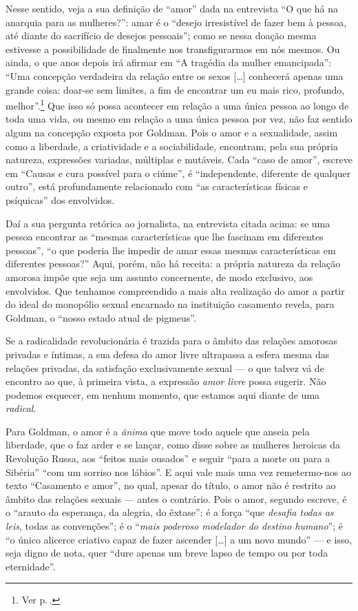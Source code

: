 Nesse sentido, veja a sua definição de ``amor''
dada na entrevista ``O que há na anarquia
para as mulheres?'': amar é o ``desejo irresistível de fazer bem à
pessoa, até diante do sacrifício de desejos pessoais''; como se nessa
doação mesma estivesse a possibilidade de finalmente nos transfigurarmos
em nós mesmos. Ou ainda, o que anos depois irá afirmar em ``A tragédia
da mulher emancipada'': ``Uma concepção verdadeira da relação entre os
sexos {[}\ldots{]} conhecerá apenas uma grande coisa: doar-se sem limites,
a fim de encontrar um eu mais rico, profundo, melhor''.\footnote{Ver p.\,\pageref{concepcao}.} Que isso só
possa acontecer em relação a uma única pessoa ao longo de toda uma
vida, ou mesmo em relação a uma única pessoa por vez, não faz sentido algum na
concepção exposta por Goldman. Pois o amor e a
sexualidade, assim como a liberdade, a criatividade e a sociabilidade,
encontram, pela sua própria natureza, expressões variadas, múltiplas e
mutáveis. Cada ``caso de amor'', escreve em ``Causas e cura possível
para o ciúme'', é ``independente, diferente de qualquer outro'', está
profundamente relacionado com ``as características físicas e psíquicas''
dos envolvidos.

Daí a sua pergunta retórica ao jornalista, na entrevista
citada acima: se uma pessoa encontrar as ``mesmas características que lhe
fascinam em diferentes pessoas'', ``o que poderia lhe impedir de amar
essas mesmas características em diferentes pessoas?'' Aqui, porém, não
há receita: a própria natureza da relação amorosa impõe que seja um
assunto concernente, de modo exclusivo, aos envolvidos. Que tenhamos
compreendido a mais alta realização do amor a partir do ideal do
monopólio sexual encarnado na instituição casamento revela, para
Goldman, o ``nosso estado atual de pigmeus''.

Se a radicalidade revolucionária é trazida para
o âmbito das relações amorosas privadas e íntimas, a sua
defesa do amor livre ultrapassa a esfera mesma das relações
privadas, da satisfação exclusivamente sexual --- o que talvez
vá de encontro ao que, à primeira vista, a expressão \textit{amor livre}
possa sugerir. Não podemos esquecer, em nenhum momento, que estamos aqui
diante de uma \emph{radical}.

Para Goldman, o amor é a \emph{ânima} que
move todo aquele que anseia pela liberdade, que o faz arder e se lançar,
como disse sobre as mulheres heroicas da Revolução Russa, aos ``feitos
mais ousados'' ​​e seguir ``para a morte ou para a Sibéria'' ``com um
sorriso nos lábios''. E aqui vale mais uma vez remetermo-nos ao texto
``Casamento e amor'', no qual, apesar do título, o amor não é
restrito ao âmbito das relações sexuais --- antes o contrário. Pois o
amor, segundo escreve, é o ``arauto da esperança, da alegria, do
êxtase''; é a força ``que \textit{desafia todas as leis}, todas as
convenções''; é o ``\textit{mais poderoso modelador do destino humano}'';
é ``o único alicerce criativo capaz de fazer ascender {[}\ldots{]} a um
novo mundo'' --- e isso, seja digno de nota, quer ``dure apenas um breve
lapso de tempo ou por toda eternidade''. 

